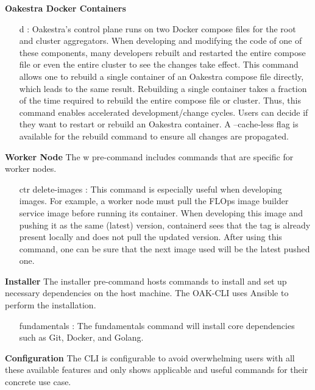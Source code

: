 \vspace{5mm}
\textbf{Oakestra Docker Containers}
\begin{itemize}
    \item [d]:
        Oakestra's control plane runs on two Docker compose files for the root and cluster aggregators.
        When developing and modifying the code of one of these components, many developers rebuilt and restarted the entire compose file or even the entire cluster to see the changes take effect.
        This command allows one to rebuild a single container of an Oakestra compose file directly, which leads to the same result.
        Rebuilding a single container takes a fraction of the time required to rebuild the entire compose file or cluster.
        Thus, this command enables accelerated development/change cycles.
        Users can decide if they want to restart or rebuild an Oakestra container.
        A --cache-less flag is available for the rebuild command to ensure all changes are propagated.
\end{itemize}
\vspace{5mm}
\textbf{Worker Node}\newline
The w pre-command includes commands that are specific for worker nodes.
\begin{itemize}
    \item [ctr delete-images]:
        This command is especially useful when developing images.
        For example, a worker node must pull the FLOps image builder service image before running its container.
        When developing this image and pushing it as the same (latest) version, containerd sees that the tag is already present locally and does not pull the updated version.
        After using this command, one can be sure that the next image used will be the latest pushed one.
\end{itemize}
\vspace{5mm}
\textbf{Installer}\newline
The installer pre-command hosts commands to install and set up necessary dependencies on the host machine.
The OAK-CLI uses Ansible to perform the installation.
\begin{itemize}
    \item [fundamentals]:
        The fundamentals command will install core dependencies such as Git, Docker, and Golang.
\end{itemize}
\vspace{5mm}
\textbf{Configuration}\newline
The CLI is configurable to avoid overwhelming users with all these available features and only shows applicable and useful commands for their concrete use case.
